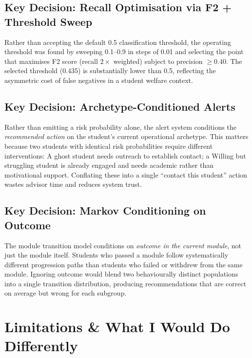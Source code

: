 \documentclass[10pt,a4paper]{article}
\begin{document}
\subsection{Key Decision: Recall Optimisation via F2 + Threshold Sweep}

Rather than accepting the default 0.5 classification threshold, the operating threshold was
found by sweeping 0.1–0.9 in steps of 0.01 and selecting the point that maximises F2 score
(recall $2\times$ weighted) subject to precision $\geq 0.40$. The selected threshold (0.435)
is substantially lower than 0.5, reflecting the asymmetric cost of false negatives in a
student welfare context.

\subsection{Key Decision: Archetype-Conditioned Alerts}

Rather than emitting a risk probability alone, the alert system conditions the
\emph{recommended action} on the student's current operational archetype. This matters
because two students with identical risk probabilities require different interventions:
A ghost student needs outreach to establish contact; a Willing but struggling student is
already engaged and needs academic rather than motivational support. Conflating these
into a single ``contact this student'' action wastes advisor time and reduces system trust.

\subsection{Key Decision: Markov Conditioning on Outcome}

The module transition model conditions on \emph{outcome in the current module}, not just
the module itself. Students who passed a module follow systematically different progression
paths than students who failed or withdrew from the same module. Ignoring outcome would
blend two behaviourally distinct populations into a single transition distribution, producing
recommendations that are correct on average but wrong for each subgroup.

\newpage


\section{Limitations \& What I Would Do Differently}
\end{document}
